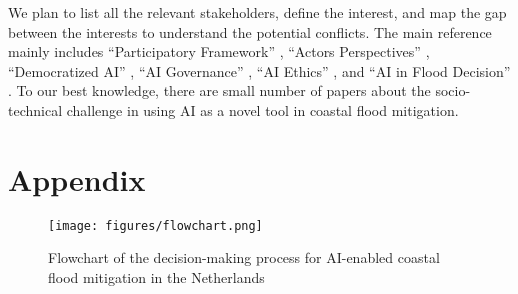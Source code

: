 \documentclass[UTF8,a4paper,AutoFakeBold,AutoFakeSlant]{article}
\begin{document}
We plan to list all the relevant stakeholders, define the interest, and map the gap between the interests to understand the potential conflicts. The main reference mainly includes “Participatory Framework” \cite{lee2019}, “Actors Perspectives” \cite{lai2020}, “Democratized AI” \cite{montes2018}, “AI Governance” \cite{truby2020}, “AI Ethics” \cite{ryan2020}, and “AI in Flood Decision” \cite{samadi2024}. To our best knowledge, there are small number of papers about the socio-technical challenge in using AI as a novel tool in coastal flood mitigation.


\newpage
\section*{Appendix}
\begin{figure}[H]
    \centering
    \texttt{[image: figures/flowchart.png]}
    \caption{Flowchart of the decision-making process for AI-enabled coastal flood mitigation in the Netherlands}
    \label{fig:flowchart}
\end{figure}







% 


\end{document}
